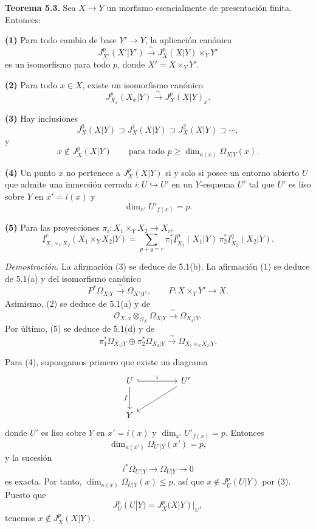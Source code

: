\par\medskip
\noindent\textbf{Teorema 5.3.}
Sea $X\longrightarrow Y$ un morfismo esencialmente de presentación
finita. Entonces:

\smallskip
\noindent\textbf{(1)} Para todo cambio de base
$Y'\longrightarrow Y$, la aplicación canónica
\[
J_{X'}^p(X'|Y')\xrightarrow{\ \sim\ }
J_X^p(X|Y)\times_YY'
\]
es un isomorfismo para todo $p$, donde $X'=X\times_YY'$.

\smallskip
\noindent\textbf{(2)} Para todo $x\in X$, existe un isomorfismo
canónico
\[
J_{X_x}^p(X_x|Y)\xrightarrow{\ \sim\ }J_X^p(X|Y)_x.
\]

\smallskip
\noindent\textbf{(3)} Hay inclusiones
\[
J_X^0(X|Y)\supset J_X^1(X|Y)\supset J_X^2(X|Y)\supset\cdots,
\]
y
\[
x\notin J_X^p(X|Y)
\qquad\text{para todo }p\geq
\dim_{\kappa(x)}\Omega_{X|Y}(x).
\]

\smallskip
\noindent\textbf{(4)} Un punto $x$ no pertenece a
$J_X^p(X|Y)$ si y solo si posee un entorno abierto $U$ que admite una
inmersión cerrada $i:U\hookrightarrow U'$ en un $Y$-esquema $U'$
tal que $U'$ es liso sobre $Y$ en $x'=i(x)$ y
\[
\dim_{x'}U'_{f(x)}=p.
\]

\smallskip
\noindent\textbf{(5)} Para las proyecciones
$\pi_i:X_1\times_YX_2\longrightarrow X_i$,
\[
\underline I_{X_1\times_YX_2}^r(X_1\times_YX_2|Y)
=\sum_{p+q=r}
 \pi_1^*\underline I_{X_1}^p(X_1|Y)\,
 \pi_2^*\underline I_{X_2}^q(X_2|Y).
\]

\smallskip
\noindent\textit{Demostración.}
La afirmación (3) se deduce de 5.1(b). La afirmación (1) se deduce de
5.1(a) y del isomorfismo canónico
\[
P^*\Omega_{X|Y}\xrightarrow{\ \sim\ }\Omega_{X'|Y'},
\qquad P:X\times_YY'\longrightarrow X.
\]
Asimismo, (2) se deduce de 5.1(a) y de
\[
\mathcal O_{X,x}\otimes_{\mathcal O_X}\Omega_{X|Y}
\xrightarrow{\ \sim\ }\Omega_{X_x|Y}.
\]
Por último, (5) se deduce de 5.1(d) y de
\[
\pi_1^*\Omega_{X_1|Y}\oplus\pi_2^*\Omega_{X_2|Y}
\xrightarrow{\ \sim\ }
\Omega_{X_1\times_YX_2|Y}.
\]

Para (4), supongamos primero que existe un diagrama
\[
\begin{tikzcd}[column sep=huge,row sep=large]
U \arrow[r,hook,"i"] \arrow[d,"f"']
  & U' \arrow[dl] \\
Y & {}
\end{tikzcd}
\]
donde $U'$ es liso sobre $Y$ en $x'=i(x)$ y
$\dim_{x'}U'_{f(x)}=p$. Entonces
\[
\dim_{\kappa(x')}\Omega_{U'|Y}(x')=p,
\]
y la sucesión
\[
i^*\Omega_{U'|Y}\longrightarrow\Omega_{U|Y}\longrightarrow0
\]
es exacta. Por tanto,
$\dim_{\kappa(x)}\Omega_{U|Y}(x)\leq p$, así que
$x\notin J_U^p(U|Y)$ por (3). Puesto que
\[
J_U^p(U|Y)=J_X^p(X|Y)|_U,
\]
tenemos $x\notin J_X^p(X|Y)$.

